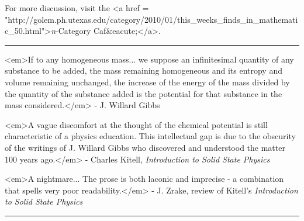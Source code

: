 For more discussion, visit the 
<a href = "http://golem.ph.utexas.edu/category/2010/01/this_weeks_finds_in_mathematic_50.html">\emph{n}-Category Caf&eacute;</a>.


\par\noindent\rule{\textwidth}{0.4pt}
<em>If to any homogeneous mass... we suppose an infinitesimal quantity
of any substance to be added, the mass remaining homogeneous and its
entropy and volume remaining unchanged, the increase of the energy of
the mass divided by the quantity of the substance added is the
potential for that substance in the mass considered.</em> - J. Willard
Gibbs

<em>A vague discomfort at the thought of the chemical potential is
still characteristic of a physics education.  This intellectual gap is
due to the obscurity of the writings of J. Willard Gibbs who
discovered and understood the matter 100 years ago.</em> - Charles
Kitell, \emph{Introduction to Solid State Physics}

<em>A nightmare... The prose is both laconic and imprecise - a
combination that spells very poor readability.</em> - J. Zrake, review
of Kitell's \emph{Introduction to Solid State Physics}

\par\noindent\rule{\textwidth}{0.4pt}


